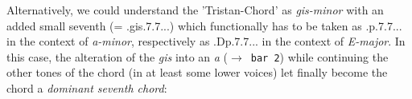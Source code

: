 \documentclass[
  DIV=calc,
  BCOR=5mm,
  12pt,
  headings=small,
  oneside,
  abstract=true,
  toc=bib,
  xcolor=dvipsnames,
  openany,
  english]{scrartcl}
\newcommand{\acc}[0]{\textit}
\newcommand{\ra}[0]{$\rightarrow$}
\begin{document}
\begin{center}
\end{center}


Alternatively, we could understand the 'Tristan-Chord' as \acc{gis-minor} with
an added small seventh (= \HH.gis.7.7...) which  functionally has to be taken as
\HH.{\DD}p.7.7... in the context of \acc{a-minor}, respectively as
\HH.{D}p.7.7... in the context of \acc{E-major}. In this case, the alteration of
the \acc{gis} into an \acc{a} (\ra\ \texttt{bar 2}) while continuing the other
tones of the chord (in at least some lower voices) let finally become the chord
a \acc{dominant seventh chord}:
\end{document}
